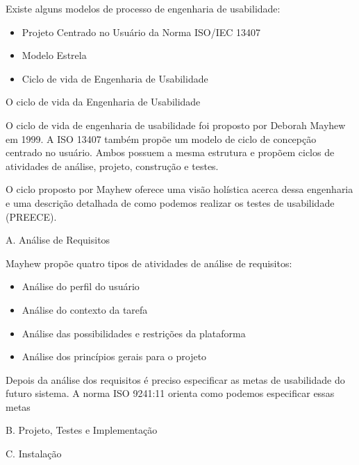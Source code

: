 	Existe alguns modelos de processo de engenharia de usabilidade:

\begin{itemize}
\item Projeto Centrado no Usuário da Norma ISO/IEC 13407
\item Modelo Estrela
\item Ciclo de vida de Engenharia de Usabilidade
\end{itemize}


O ciclo de vida da Engenharia de Usabilidade

	
	O ciclo de vida de engenharia de usabilidade foi proposto por Deborah Mayhew em 1999. 
A ISO 13407 também propõe um modelo de ciclo de concepção centrado no usuário. Ambos possuem a mesma estrutura e propõem ciclos de atividades de análise, projeto, construção e testes. ~\cite{cybis2010ergonomia}

	O ciclo proposto por Mayhew oferece uma visão holística acerca dessa engenharia e uma descrição detalhada de como podemos realizar os testes de usabilidade (PREECE).

A. Análise de Requisitos

	Mayhew propõe quatro tipos de atividades de análise de requisitos: 

\begin{itemize}
\item Análise do perfil do usuário
\item Análise do contexto da tarefa
\item Análise das possibilidades e restrições da plataforma
\item Análise dos princípios gerais para o projeto
\end{itemize}

	Depois da análise dos requisitos é preciso especificar as metas de usabilidade do futuro sistema. A norma ISO 9241:11 orienta como podemos especificar essas metas

B. Projeto, Testes e Implementação

	

C. Instalação



